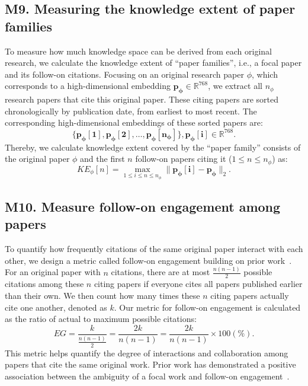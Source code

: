 \subsection*{M9. Measuring the knowledge extent of paper families}
To measure how much knowledge space can be derived from each original research, we calculate the knowledge extent of “paper families”, i.e., a focal paper and its follow-on citations.
Focusing on an original research paper $\phi$, which corresponds to a high-dimensional embedding $\mathbf{p_{\phi}}\in\mathbb{R}^{768}$, we extract all $n_{\phi}$ research papers that cite this original paper.
These citing papers are sorted chronologically by publication date, from earliest to most recent.
The corresponding high-dimensional embeddings of these sorted papers are:
\begin{equation}
    \{\mathbf{p_{\phi}[1]},\mathbf{p_{\phi}[2]},\dots,\mathbf{p_{\phi}[n_{\phi}]}\}, \mathbf{p_{\phi}[i]}\in\mathbb{R}^{768}.
\end{equation}
Thereby, we calculate knowledge extent covered by the “paper family” consists of the original paper $\phi$ and the first $n$ follow-on papers citing it ($1 \leq n \leq n_{\phi}$) as:
\begin{equation}
    KE_{\phi}[n] = \max_{1\leq i\leq n\leq n_{\phi}}\|\mathbf{p_{\phi}[i]}-\mathbf{p_{\phi}}\|_2.
\end{equation}

\subsection*{M10. Measure follow-on engagement among papers}
To quantify how frequently citations of the same original paper interact with each other, we design a metric called follow-on engagement building on prior work~\supercite{mcmahan2018ambiguity}.
For an original paper with $n$ citations, there are at most $\frac{n(n-1)}{2}$ possible citations among these $n$ citing papers if everyone cites all papers published earlier than their own.
We then count how many times these $n$ citing papers actually cite one another, denoted as $k$.
Our metric for follow-on engagement is calculated as the ratio of actual to maximum possible citations:
\begin{equation}
    EG = \frac{k}{\frac{n(n-1)}{2}} = \frac{2k}{n(n-1)} = \frac{2k}{n(n-1)} \times 100 (\%). 
\end{equation}
This metric helps quantify the degree of interactions and collaboration among papers that cite the same original work. Prior work has demonstrated a positive association between the ambiguity of a focal work and follow-on engagement~\supercite{mcmahan2018ambiguity}.